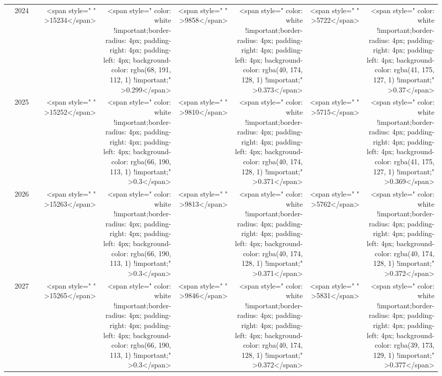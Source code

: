 \begin{table}
\begin{tabular}[t]{>{}l|l>{}rr>{}r|rrrr}
 & 2024 & \cellcolor[HTML]{858379}{\textcolor{white}{700}} & <span style="     " >15234</span> & <span style="     color: white !important;border-radius: 4px; padding-right: 4px; padding-left: 4px; background-color: rgba(68, 191, 112, 1) !important;" >0.299</span> & <span style="     " >9858</span> & <span style="     color: white !important;border-radius: 4px; padding-right: 4px; padding-left: 4px; background-color: rgba(40, 174, 128, 1) !important;" >0.373</span> & <span style="     " >5722</span> & <span style="     color: white !important;border-radius: 4px; padding-right: 4px; padding-left: 4px; background-color: rgba(41, 175, 127, 1) !important;" >0.37</span>\\

 & 2025 & \cellcolor[HTML]{858379}{\textcolor{white}{700}} & <span style="     " >15252</span> & <span style="     color: white !important;border-radius: 4px; padding-right: 4px; padding-left: 4px; background-color: rgba(66, 190, 113, 1) !important;" >0.3</span> & <span style="     " >9810</span> & <span style="     color: white !important;border-radius: 4px; padding-right: 4px; padding-left: 4px; background-color: rgba(40, 174, 128, 1) !important;" >0.371</span> & <span style="     " >5715</span> & <span style="     color: white !important;border-radius: 4px; padding-right: 4px; padding-left: 4px; background-color: rgba(41, 175, 127, 1) !important;" >0.369</span>\\

 & 2026 & \cellcolor[HTML]{858379}{\textcolor{white}{700}} & <span style="     " >15263</span> & <span style="     color: white !important;border-radius: 4px; padding-right: 4px; padding-left: 4px; background-color: rgba(66, 190, 113, 1) !important;" >0.3</span> & <span style="     " >9813</span> & <span style="     color: white !important;border-radius: 4px; padding-right: 4px; padding-left: 4px; background-color: rgba(40, 174, 128, 1) !important;" >0.371</span> & <span style="     " >5762</span> & <span style="     color: white !important;border-radius: 4px; padding-right: 4px; padding-left: 4px; background-color: rgba(40, 174, 128, 1) !important;" >0.372</span>\\

 & 2027 & \cellcolor[HTML]{858379}{\textcolor{white}{700}} & <span style="     " >15265</span> & <span style="     color: white !important;border-radius: 4px; padding-right: 4px; padding-left: 4px; background-color: rgba(66, 190, 113, 1) !important;" >0.3</span> & <span style="     " >9846</span> & <span style="     color: white !important;border-radius: 4px; padding-right: 4px; padding-left: 4px; background-color: rgba(40, 174, 128, 1) !important;" >0.372</span> & <span style="     " >5831</span> & <span style="     color: white !important;border-radius: 4px; padding-right: 4px; padding-left: 4px; background-color: rgba(39, 173, 129, 1) !important;" >0.377</span>\\


\end{tabular}
\end{table}
